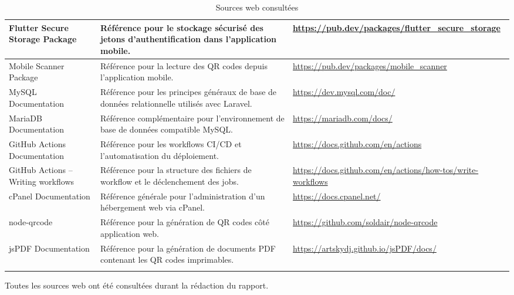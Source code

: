 \begin{longtable}{|p{4cm}|p{7.1cm}|p{3.2cm}|}
Flutter Secure Storage Package & Référence pour le stockage sécurisé des jetons d'authentification dans l'application mobile. & \url{https://pub.dev/packages/flutter_secure_storage} \\
\hline

Mobile Scanner Package & Référence pour la lecture des QR codes depuis l'application mobile. & \url{https://pub.dev/packages/mobile_scanner} \\
\hline

MySQL Documentation & Référence pour les principes généraux de base de données relationnelle utilisés avec Laravel. & \url{https://dev.mysql.com/doc/} \\
\hline

MariaDB Documentation & Référence complémentaire pour l'environnement de base de données compatible MySQL. & \url{https://mariadb.com/docs/} \\
\hline

GitHub Actions Documentation & Référence pour les workflows CI/CD et l'automatisation du déploiement. & \url{https://docs.github.com/en/actions} \\
\hline

GitHub Actions -- Writing workflows & Référence pour la structure des fichiers de workflow et le déclenchement des jobs. & \url{https://docs.github.com/en/actions/how-tos/write-workflows} \\
\hline

cPanel Documentation & Référence générale pour l'administration d'un hébergement web via cPanel. & \url{https://docs.cpanel.net/} \\
\hline

node-qrcode & Référence pour la génération de QR codes côté application web. & \url{https://github.com/soldair/node-qrcode} \\
\hline

jsPDF Documentation & Référence pour la génération de documents PDF contenant les QR codes imprimables. & \url{https://artskydj.github.io/jsPDF/docs/} \\
\hline

\caption{Sources web consultées}
\label{tab:webographie}
\end{longtable}
\normalsize

\vspace{0.3cm}
\noindent Toutes les sources web ont été consultées durant la rédaction du rapport.
